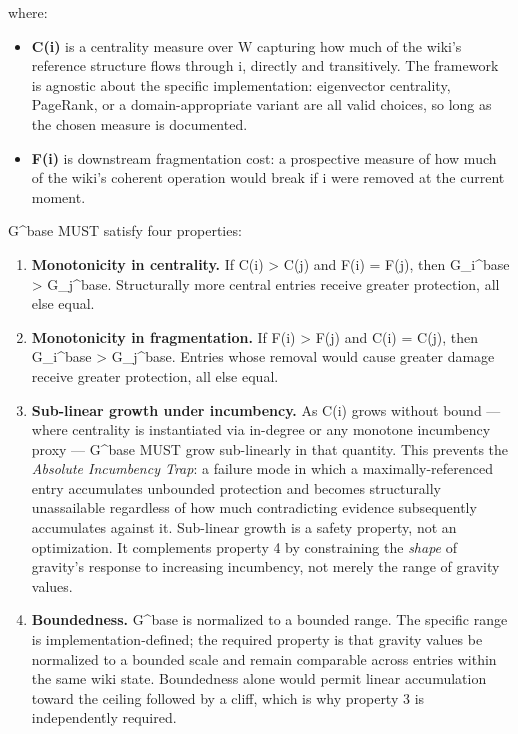 \documentclass[
  11pt,
]{article}
\providecommand{\tightlist}{%
  \setlength{\itemsep}{0pt}\setlength{\parskip}{0pt}}
\begin{document}
where:

\begin{itemize}
\tightlist
\item
  \textbf{C(i)} is a centrality measure over W capturing how much of the
  wiki's reference structure flows through i, directly and transitively.
  The framework is agnostic about the specific implementation:
  eigenvector centrality, PageRank, or a domain-appropriate variant are
  all valid choices, so long as the chosen measure is documented.
\item
  \textbf{F(i)} is downstream fragmentation cost: a prospective measure
  of how much of the wiki's coherent operation would break if i were
  removed at the current moment.
\end{itemize}

G\^{}base MUST satisfy four properties:

\begin{enumerate}
\def\labelenumi{\arabic{enumi}.}
\tightlist
\item
  \textbf{Monotonicity in centrality.} If C(i) \textgreater{} C(j) and
  F(i) = F(j), then G\_i\^{}base \textgreater{} G\_j\^{}base.
  Structurally more central entries receive greater protection, all else
  equal.
\item
  \textbf{Monotonicity in fragmentation.} If F(i) \textgreater{} F(j)
  and C(i) = C(j), then G\_i\^{}base \textgreater{} G\_j\^{}base.
  Entries whose removal would cause greater damage receive greater
  protection, all else equal.
\item
  \textbf{Sub-linear growth under incumbency.} As C(i) grows without
  bound --- where centrality is instantiated via in-degree or any
  monotone incumbency proxy --- G\^{}base MUST grow sub-linearly in that
  quantity. This prevents the \emph{Absolute Incumbency Trap}: a failure
  mode in which a maximally-referenced entry accumulates unbounded
  protection and becomes structurally unassailable regardless of how
  much contradicting evidence subsequently accumulates against it.
  Sub-linear growth is a safety property, not an optimization. It
  complements property 4 by constraining the \emph{shape} of gravity's
  response to increasing incumbency, not merely the range of gravity
  values.
\item
  \textbf{Boundedness.} G\^{}base is normalized to a bounded range. The
  specific range is implementation-defined; the required property is
  that gravity values be normalized to a bounded scale and remain
  comparable across entries within the same wiki state. Boundedness
  alone would permit linear accumulation toward the ceiling followed by
  a cliff, which is why property 3 is independently required.
\end{enumerate}
\end{document}
